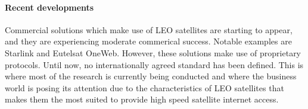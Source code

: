 \paragraph{Recent developments}
Commercial solutions which make use of \ac{LEO} satellites are starting to appear, and they are experiencing moderate commerical success. Notable examples are Starlink and Eutelsat OneWeb. However, these solutions make use of proprietary protocols. Until now, no internationally agreed standard has been defined. This is where most of the research is currently being conducted and where the business world is posing its attention due to the characteristics of \ac{LEO} satellites that makes them the most suited to provide high speed satellite internet access.